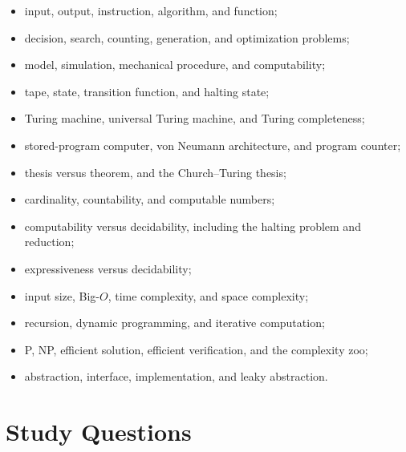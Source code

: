 \documentclass[11pt]{article}
\begin{document}
\begin{conceptcheck}
\begin{itemize}
  \item input, output, instruction, algorithm, and function;
  \item decision, search, counting, generation, and optimization problems;
  \item model, simulation, mechanical procedure, and computability;
  \item tape, state, transition function, and halting state;
  \item Turing machine, universal Turing machine, and Turing completeness;
  \item stored-program computer, von Neumann architecture, and program counter;
  \item thesis versus theorem, and the Church--Turing thesis;
  \item cardinality, countability, and computable numbers;
  \item computability versus decidability, including the halting problem and reduction;
  \item expressiveness versus decidability;
  \item input size, Big-$O$, time complexity, and space complexity;
  \item recursion, dynamic programming, and iterative computation;
  \item P, NP, efficient solution, efficient verification, and the complexity zoo;
  \item abstraction, interface, implementation, and leaky abstraction.
\end{itemize}
\end{conceptcheck}

\section{Study Questions}
\end{document}
